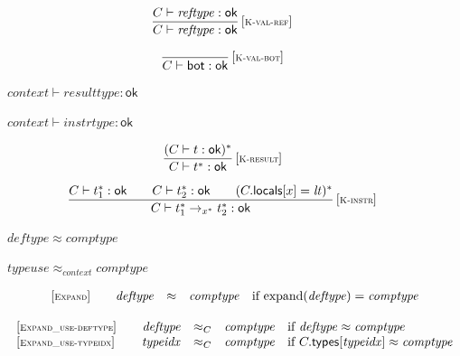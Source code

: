 $$
\begin{array}{@{}c@{}}\displaystyle
\frac{
C \vdash {\mathit{reftype}} : \mathsf{ok}
}{
C \vdash {\mathit{reftype}} : \mathsf{ok}
} \, {[\textsc{\scriptsize K{-}val{-}ref}]}
\qquad
\end{array}
$$

$$
\begin{array}{@{}c@{}}\displaystyle
\frac{
}{
C \vdash \mathsf{bot} : \mathsf{ok}
} \, {[\textsc{\scriptsize K{-}val{-}bot}]}
\qquad
\end{array}
$$

\vspace{1ex}

$\boxed{{\mathit{context}} \vdash {\mathit{resulttype}} : \mathsf{ok}}$

$\boxed{{\mathit{context}} \vdash {\mathit{instrtype}} : \mathsf{ok}}$

$$
\begin{array}{@{}c@{}}\displaystyle
\frac{
(C \vdash t : \mathsf{ok})^\ast
}{
C \vdash {t^\ast} : \mathsf{ok}
} \, {[\textsc{\scriptsize K{-}result}]}
\qquad
\end{array}
$$

$$
\begin{array}{@{}c@{}}\displaystyle
\frac{
C \vdash {t_1^\ast} : \mathsf{ok}
 \qquad
C \vdash {t_2^\ast} : \mathsf{ok}
 \qquad
(C{.}\mathsf{locals}{}[x] = {{\mathit{lt}}})^\ast
}{
C \vdash {t_1^\ast} \rightarrow_{{x^\ast}} {t_2^\ast} : \mathsf{ok}
} \, {[\textsc{\scriptsize K{-}instr}]}
\qquad
\end{array}
$$

\vspace{1ex}

$\boxed{{\mathit{deftype}} \approx {\mathit{comptype}}}$

$\boxed{{\mathit{typeuse}} \approx_{{\mathit{context}}} {\mathit{comptype}}}$

$$
\begin{array}[t]{@{}lrcl@{}l@{}}
{[\textsc{\scriptsize Expand}]} \quad & {\mathit{deftype}} & \approx & {\mathit{comptype}} & \quad \mbox{if}~ {\mathrm{expand}}({\mathit{deftype}}) = {\mathit{comptype}} \\
\end{array}
$$

$$
\begin{array}[t]{@{}lrcl@{}l@{}}
{[\textsc{\scriptsize Expand\_use{-}deftype}]} \quad & {\mathit{deftype}} & {\approx}_{C} {} & {\mathit{comptype}} & \quad \mbox{if}~ {\mathit{deftype}} \approx {\mathit{comptype}} \\
{[\textsc{\scriptsize Expand\_use{-}typeidx}]} \quad & {\mathit{typeidx}} & {\approx}_{C} {} & {\mathit{comptype}} & \quad \mbox{if}~ C{.}\mathsf{types}{}[{\mathit{typeidx}}] \approx {\mathit{comptype}} \\
\end{array}
$$

